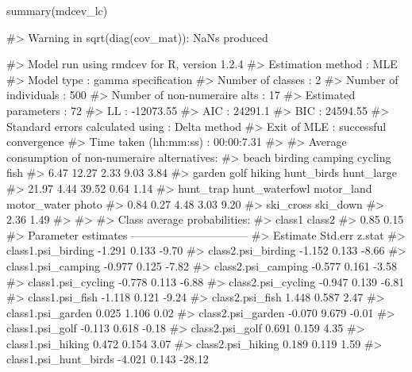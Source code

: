 \begin{Schunk}
\begin{Sinput}
summary(mdcev_lc)
\end{Sinput}
\begin{Soutput}
#> Warning in sqrt(diag(cov_mat)): NaNs produced
\end{Soutput}
\begin{Soutput}
#> Model run using rmdcev for R, version 1.2.4 
#> Estimation method                : MLE
#> Model type                       : gamma specification
#> Number of classes                : 2
#> Number of individuals            : 500
#> Number of non-numeraire alts     : 17
#> Estimated parameters             : 72
#> LL                               : -12073.55
#> AIC                              : 24291.1
#> BIC                              : 24594.55
#> Standard errors calculated using : Delta method
#> Exit of MLE                      : successful convergence
#> Time taken (hh:mm:ss)            : 00:00:7.31
#> 
#> Average consumption of non-numeraire alternatives:
#>          beach        birding        camping        cycling           fish 
#>           6.47          12.27           2.33           9.03           3.84 
#>         garden           golf         hiking     hunt_birds     hunt_large 
#>          21.97           4.44          39.52           0.64           1.14 
#>      hunt_trap hunt_waterfowl     motor_land    motor_water          photo 
#>           0.84           0.27           4.48           3.03           9.20 
#>      ski_cross       ski_down 
#>           2.36           1.49 
#> 
#> 
#> Class average probabilities:
#> class1 class2 
#>   0.85   0.15 
#> Parameter estimates --------------------------------  
#>                             Estimate Std.err z.stat
#> class1.psi_birding            -1.291   0.133  -9.70
#> class2.psi_birding            -1.152   0.133  -8.66
#> class1.psi_camping            -0.977   0.125  -7.82
#> class2.psi_camping            -0.577   0.161  -3.58
#> class1.psi_cycling            -0.778   0.113  -6.88
#> class2.psi_cycling            -0.947   0.139  -6.81
#> class1.psi_fish               -1.118   0.121  -9.24
#> class2.psi_fish                1.448   0.587   2.47
#> class1.psi_garden              0.025   1.106   0.02
#> class2.psi_garden             -0.070   9.679  -0.01
#> class1.psi_golf               -0.113   0.618  -0.18
#> class2.psi_golf                0.691   0.159   4.35
#> class1.psi_hiking              0.472   0.154   3.07
#> class2.psi_hiking              0.189   0.119   1.59
#> class1.psi_hunt_birds         -4.021   0.143 -28.12

\end{Soutput}
\end{Schunk}
